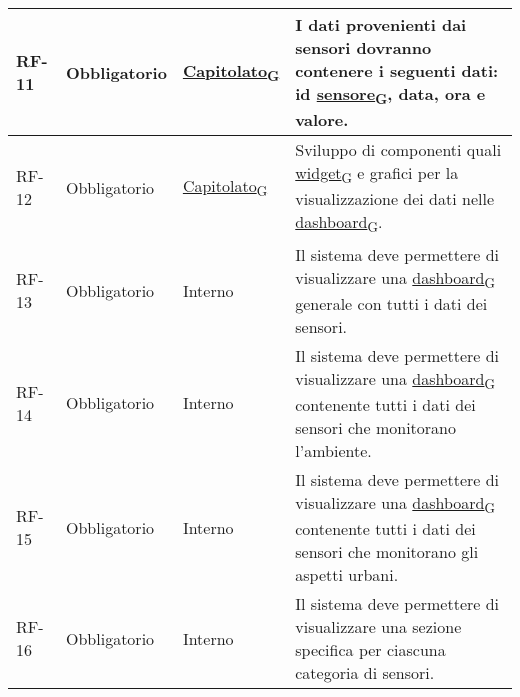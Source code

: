 \begin{longtable}{|>{\centering\arraybackslash}m{}|>{\centering\arraybackslash}m{}|>{\centering\arraybackslash}m{}|>{\centering\arraybackslash}m{}|}
	\\\hline
	RF-11           & Obbligatorio        & \href{https://7last.github.io/docs/rtb/documentazione-interna/glossario\#capitolato}{Capitolato\textsubscript{G}} & I dati provenienti dai sensori dovranno contenere i seguenti dati: id \href{https://7last.github.io/docs/rtb/documentazione-interna/glossario\#sensore}{sensore\textsubscript{G}}, data, ora e valore.
	\\\hline
	RF-12           & Obbligatorio        & \href{https://7last.github.io/docs/rtb/documentazione-interna/glossario\#capitolato}{Capitolato\textsubscript{G}} & Sviluppo di componenti quali \href{https://7last.github.io/docs/rtb/documentazione-interna/glossario\#widget}{widget\textsubscript{G}} e grafici per la visualizzazione dei dati nelle \href{https://7last.github.io/docs/rtb/documentazione-interna/glossario\#dashboard}{dashboard\textsubscript{G}}.
	\\\hline
	RF-13           & Obbligatorio        & Interno                                                                                                           & Il sistema deve permettere di visualizzare una \href{https://7last.github.io/docs/rtb/documentazione-interna/glossario\#dashboard}{dashboard\textsubscript{G}} generale con tutti i dati dei sensori.
	\\\hline
	RF-14           & Obbligatorio        & Interno                                                                                                           & Il sistema deve permettere di visualizzare una \href{https://7last.github.io/docs/rtb/documentazione-interna/glossario\#dashboard}{dashboard\textsubscript{G}} contenente tutti i dati dei sensori che monitorano l'ambiente.
	\\\hline
	RF-15           & Obbligatorio        & Interno                                                                                                           & Il sistema deve permettere di visualizzare una \href{https://7last.github.io/docs/rtb/documentazione-interna/glossario\#dashboard}{dashboard\textsubscript{G}} contenente tutti i dati dei sensori che monitorano gli aspetti urbani.
	\\\hline
	RF-16           & Obbligatorio        & Interno                                                                                                           & Il sistema deve permettere di visualizzare una sezione specifica per ciascuna categoria di sensori.
	\\\hline

\end{longtable}
